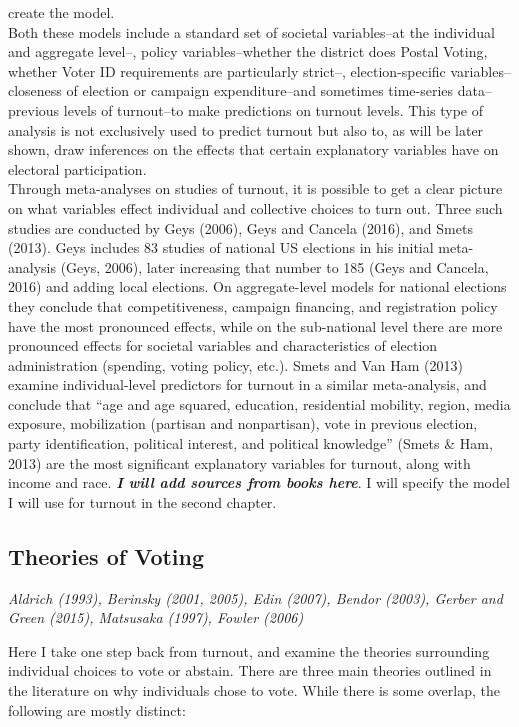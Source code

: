 \documentclass[12pt,twoside]{reedthesis}
\begin{document}
  create the model.\\
  Both these models include a standard set of societal variables--at the
  individual and aggregate level--, policy variables--whether the district
  does Postal Voting, whether Voter ID requirements are particularly
  strict--, election-specific variables--closeness of election or campaign
  expenditure--and sometimes time-series data--previous levels of
  turnout--to make predictions on turnout levels. This type of analysis is
  not exclusively used to predict turnout but also to, as will be later
  shown, draw inferences on the effects that certain explanatory variables
  have on electoral participation.\\
  Through meta-analyses on studies of turnout, it is possible to get a
  clear picture on what variables effect individual and collective choices
  to turn out. Three such studies are conducted by Geys (2006), Geys and
  Cancela (2016), and Smets (2013). Geys includes 83 studies of national
  US elections in his initial meta-analysis (Geys, 2006), later increasing
  that number to 185 (Geys and Cancela, 2016) and adding local elections.
  On aggregate-level models for national elections they conclude that
  competitiveness, campaign financing, and registration policy have the
  most pronounced effects, while on the sub-national level there are more
  pronounced effects for societal variables and characteristics of
  election administration (spending, voting policy, etc.). Smets and Van
  Ham (2013) examine individual-level predictors for turnout in a similar
  meta-analysis, and conclude that ``age and age squared, education,
  residential mobility, region, media exposure, mobilization (partisan and
  nonpartisan), vote in previous election, party identification, political
  interest, and political knowledge'' (Smets \& Ham, 2013) are the most
  significant explanatory variables for turnout, along with income and
  race. \textbf{\emph{I will add sources from books here}}. I will specify
  the model I will use for turnout in the second chapter.
  
  \subsection{Theories of Voting}\label{theories-of-voting}
  
  \emph{Aldrich (1993), Berinsky (2001, 2005), Edin (2007), Bendor (2003),
  Gerber and Green (2015), Matsusaka (1997), Fowler (2006)}
  
  Here I take one step back from turnout, and examine the theories
  surrounding individual choices to vote or abstain. There are three main
  theories outlined in the literature on why individuals chose to vote.
  While there is some overlap, the following are mostly distinct:
  
\end{document}

